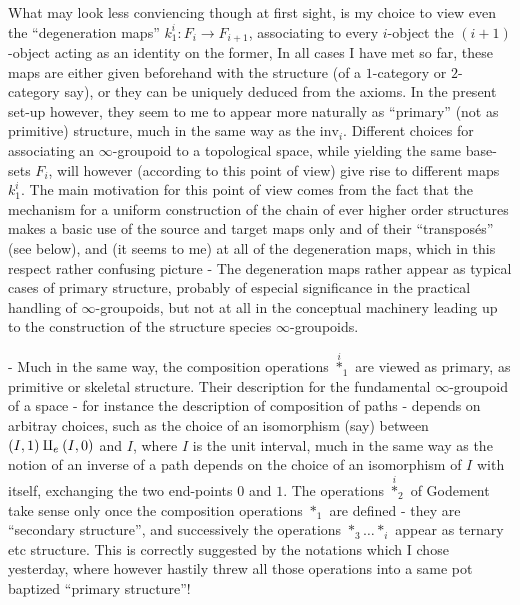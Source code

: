 What may look less conviencing though at first sight, is my choice to view  even the ``degeneration maps'' $k_1^i:F_i\to F_{i+1}$, associating to every $i$-object the $(i+1)$-object acting as an identity on the former, In all cases I have met so far, these maps are either given beforehand with the structure (of a $1$-category or $2$-category say), or they can be uniquely deduced from the axioms. In the present set-up however, they seem to me to appear more naturally as ``primary'' (not as primitive) structure, much in the same way as the $\mathrm{inv}_i$. Different choices for associating an $\infty$-groupoid to a topological space, while yielding the same base-sets $F_i$, will however (according to this point of view) give rise to different maps $k_1^i$. The main motivation for this point of view comes from the fact that the mechanism for a uniform construction of the chain of ever higher order structures makes a basic use of the source and target maps only and of their ``transposés'' (see below), and (it seems to me)  at all of the degeneration maps, which in this respect rather  confusing  picture\handwritten{,}  - The degeneration maps rather appear as typical cases of primary structure, probably of especial significance in the practical handling of $\infty$-groupoids, but not at all in the conceptual machinery leading up to the construction of the structure species  $\infty$-groupoids.

- Much in the same way, the composition operations $\overset{i}{*}_1$ are viewed as primary,  as primitive or skeletal structure. Their description for the fundamental $\infty$-groupoid of a space - for instance the description of composition of paths - depends on arbitray choices, such as the choice of an isomorphism (say) between $(I,1)\amalg_e(I,0)$ and $I$, where $I$ is the unit interval, much in the same way as the notion of an inverse of a path depends on the choice of an isomorphism of $I$ with itself, exchanging the two end-points $0$ and $1$. The operations $\overset{i}{*}_2$ of Godement take sense only once the composition operations $*_1$ are defined - they are ``secondary structure'', and successively the operations $*_3\ldots *_i$ appear as ternary etc structure. This is correctly suggested by the notations which I chose yesterday, where however  hastily threw all those operations into a same pot baptized ``primary structure''!

